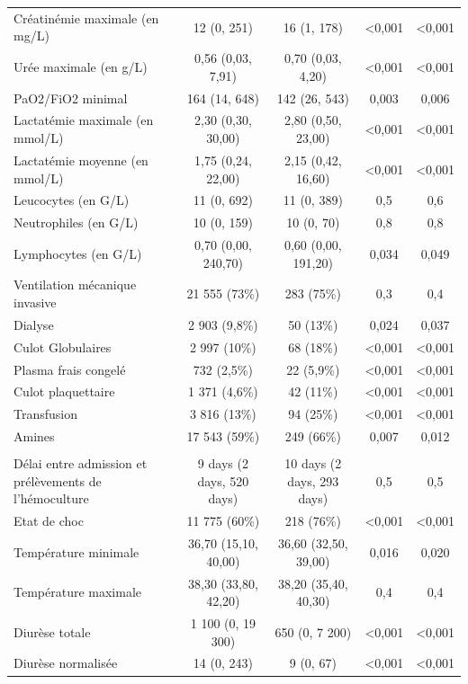 \documentclass[
  french,
  letterpaper,
  DIV=11,
  numbers=noendperiod,
  justified]{scrartcl}
\begin{document}
\begin{table}
\begin{tabular*}{\linewidth}{@{\extracolsep{\fill}}lcccc}
Créatinémie maximale (en mg/L) & 12 (0, 251) & 16 (1, 178) & <0,001 & <0,001 \\
Urée maximale (en g/L) & 0,56 (0,03, 7,91) & 0,70 (0,03, 4,20) & <0,001 & <0,001 \\
PaO2/FiO2 minimal & 164 (14, 648) & 142 (26, 543) & 0,003 & 0,006 \\
Lactatémie maximale (en mmol/L) & 2,30 (0,30, 30,00) & 2,80 (0,50, 23,00) & <0,001 & <0,001 \\
Lactatémie moyenne (en mmol/L)  & 1,75 (0,24, 22,00) & 2,15 (0,42, 16,60) & <0,001 & <0,001 \\
Leucocytes (en G/L) & 11 (0, 692) & 11 (0, 389) & 0,5 & 0,6 \\
Neutrophiles (en G/L) & 10 (0, 159) & 10 (0, 70) & 0,8 & 0,8 \\
Lymphocytes (en G/L) & 0,70 (0,00, 240,70) & 0,60 (0,00, 191,20) & 0,034 & 0,049 \\
Ventilation mécanique invasive & 21 555 (73\%) & 283 (75\%) & 0,3 & 0,4 \\
Dialyse & 2 903 (9,8\%) & 50 (13\%) & 0,024 & 0,037 \\
Culot Globulaires & 2 997 (10\%) & 68 (18\%) & <0,001 & <0,001 \\
Plasma frais congelé & 732 (2,5\%) & 22 (5,9\%) & <0,001 & <0,001 \\
Culot plaquettaire & 1 371 (4,6\%) & 42 (11\%) & <0,001 & <0,001 \\
Transfusion & 3 816 (13\%) & 94 (25\%) & <0,001 & <0,001 \\
Amines  & 17 543 (59\%) & 249 (66\%) & 0,007 & 0,012 \\
\midrule\addlinespace[2.5pt]
\multicolumn{5}{l}{{\bfseries Données dans les 48 heures précédant la suspicion d'infection}} \\[2.5pt]
\midrule\addlinespace[2.5pt]
Délai entre admission et prélèvements de l'hémoculture & 9 days (2 days, 520 days) & 10 days (2 days, 293 days) & 0,5 & 0,5 \\
Etat de choc & 11 775 (60\%) & 218 (76\%) & <0,001 & <0,001 \\
Température minimale  & 36,70 (15,10, 40,00) & 36,60 (32,50, 39,00) & 0,016 & 0,020 \\
Température maximale  & 38,30 (33,80, 42,20) & 38,20 (35,40, 40,30) & 0,4 & 0,4 \\
Diurèse totale  & 1 100 (0, 19 300) & 650 (0, 7 200) & <0,001 & <0,001 \\
Diurèse normalisée  & 14 (0, 243) & 9 (0, 67) & <0,001 & <0,001 \\

\end{tabular*}
\end{table}
\end{document}
